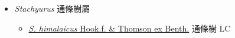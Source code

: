 
  \begin{itemize}
 \item[] \textit{Stachyurus} 通條樹屬
                                
  \begin{itemize}
        \item[] \href{http://www.theplantlist.org/tpl1.1/search?q=Stachyurus+himalaicus}{\textit{S. himalaicus} Hook.f. \& Thomson ex Benth.}   通條樹   LC
  \end{itemize}
  \end{itemize}
